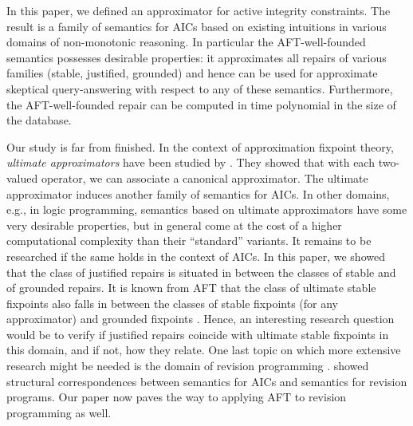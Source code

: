 In this paper, we defined an approximator for active integrity constraints. 
The result is a family of semantics for AICs based on existing intuitions in various domains of non-monotonic reasoning. 
In particular the AFT-well-founded semantics possesses desirable properties: it approximates all repairs of various families (stable, justified, grounded) and hence can be used for approximate skeptical query-answering with respect to any of these semantics. 
Furthermore, the AFT-well-founded repair can be computed in time polynomial in the size of the database. 

Our study is far from finished. 
In the context of approximation fixpoint theory, \emph{ultimate approximators} have been studied by \citet{DeneckerMT04}. 
They showed that with each two-valued operator, we can associate a canonical approximator. 
The ultimate approximator induces another family of semantics for AICs. 
In other domains, e.g., in logic programming, semantics based on ultimate approximators have some very desirable properties, but in general come at the cost of a higher computational complexity than their ``standard'' variants. 
It remains to be researched if the same holds in the context of AICs. 
In this paper, we showed that the class of justified repairs is situated in between the classes of stable and of grounded repairs. 
It is known from AFT that the class of ultimate stable fixpoints also falls in between the classes of stable fixpoints (for any approximator) and grounded fixpoints . 
Hence, an interesting research question would be to verify if justified repairs coincide with ultimate stable fixpoints in this domain, and if not, how they relate. 
One last topic on which more extensive research might be needed is the domain of revision programming \cite{tcs/MarekT98}. \citet{tplp/CaropreseT11} showed structural correspondences between semantics for AICs and semantics for revision programs. 
Our paper now paves the way to applying AFT to revision programming as well. 

% 
% 
% 
% 
% 


